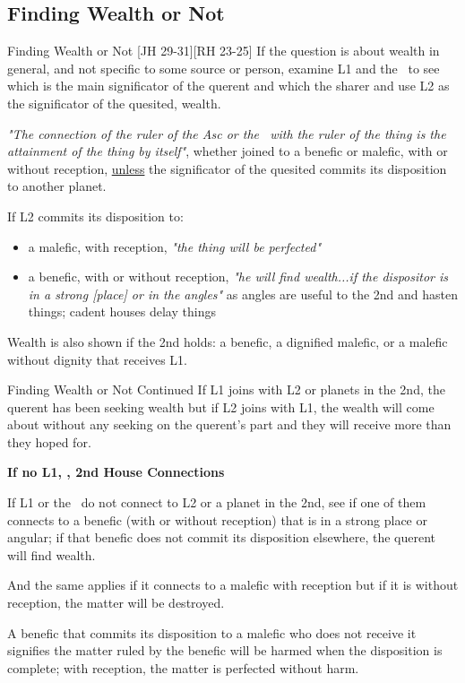 \subsection{Finding Wealth or Not}
\begin{frame}[t]{Finding Wealth or Not [JH 29-31][RH 23-25]}
If the question is about wealth in general, and not specific to some source or person, examine L1 and the \Moon\ to see which is the main significator of the querent and which the sharer and use L2 as the significator of the quesited, wealth.

\begin{block}{}
\textsl{"The connection of the ruler of the Asc or the \Moon\ with the ruler of the thing is the attainment of the thing by itself"}, whether joined to a benefic or malefic, with or without reception, \underline{unless} the significator of the quesited commits its disposition to another planet.\footnotemark[1]
\end{block}

If L2 commits its disposition to:
\begin{itemize}
\item a malefic, with reception, \textsl{"the thing will be perfected"}
\item a benefic, with or without reception, \textsl{"he will find wealth...if the dispositor is in a strong [place] or in the angles"} as angles are useful to the 2nd and hasten things; cadent houses delay things
\end{itemize}

Wealth is also shown if the 2nd holds: a benefic, a dignified malefic, or a malefic without dignity that receives L1.

\end{frame}
\begin{frame}[t]{Finding Wealth or Not Continued}
If L1 joins with L2 or planets in the 2nd, the querent has been seeking wealth but if L2 joins with L1, the wealth will come about without any seeking on the querent's part and they will receive more than they hoped for.

\textbf{If no L1, \Moon, 2nd House Connections}

If L1 or the \Moon\ do not connect to L2 or a planet in the 2nd, see if one of them connects to a benefic (with or without reception) that is in a strong place or angular; if that benefic does not commit its disposition elsewhere, the querent will find wealth. 

And the same applies if it connects to a malefic with reception but if it is without reception, the matter will be destroyed.

\begin{block}{}
A benefic that commits its disposition to a malefic who does not receive it signifies the matter ruled by the benefic will be harmed when the disposition is complete; with reception, the matter is perfected without harm.
\end{block}

\end{frame}